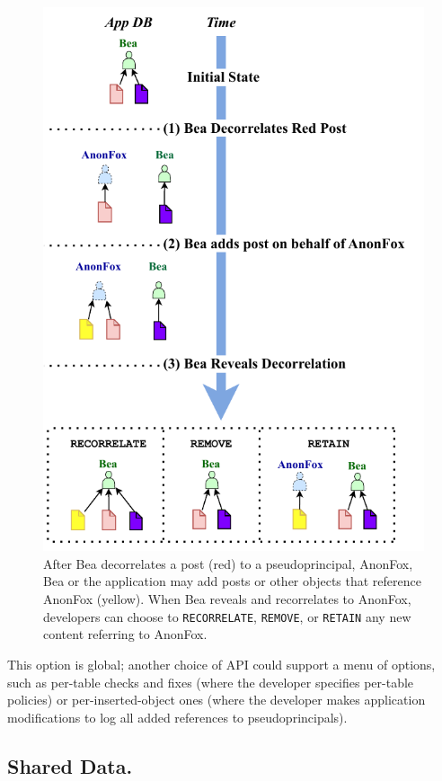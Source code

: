 \begin{figure}
    \centering
    \includegraphics[width=.7\textwidth]{figs/ppreveal_policies}
    \caption[\texttt{RECORRELATE}, \texttt{REMOVE}, and
    \texttt{RETAIN} policies maintain referential integrity for objects added after disguising that refer to
    a pseudoprincipal during reveal.]{After Bea decorrelates a post (red) to a pseudoprincipal,
    AnonFox, Bea or the application may add posts or other objects that
    reference AnonFox (yellow). When Bea reveals and recorrelates to AnonFox, developers
    can choose to \texttt{RECORRELATE}, \texttt{REMOVE}, or \texttt{RETAIN} any
    new content referring to AnonFox.}
\label{f:ppreveal}
\end{figure}

This option is global; another choice of API could support a menu of
options, such as per-table checks and fixes (where the developer specifies
per-table policies) or per-inserted-object ones (where the developer makes
application modifications to log all added references to pseudoprincipals).
%

\subsection{Shared Data.}

